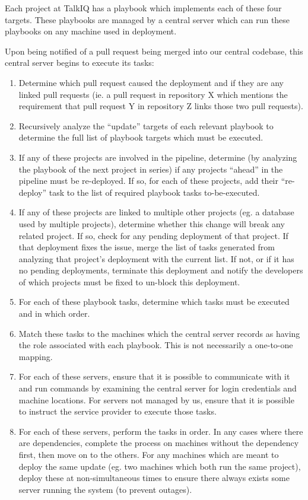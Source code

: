 \documentclass[12pt]{article}
\begin{document}
Each project at TalkIQ has a playbook which implements each of these four targets. These playbooks are managed by a central server which can run these playbooks on any machine used in deployment.

Upon being notified of a pull request being merged into our central codebase, this central server begins to execute its tasks:
\begin{enumerate}
\item Determine which pull request caused the deployment and if they are any linked pull requests (ie. a pull request in repository X which mentions the requirement that pull request Y in repository Z links those two pull requests).
\item Recursively analyze the ``update'' targets of each relevant playbook to determine the full list of playbook targets which must be executed.
\item If any of these projects are involved in the pipeline, determine (by analyzing the playbook of the next project in series) if any projects ``ahead'' in the pipeline must be re-deployed. If so, for each of these projects, add their ``re-deploy'' task to the list of required playbook tasks to-be-executed.
\item If any of these projects are linked to multiple other projects (eg. a database used by multiple projects), determine whether this change will break any related project. If so, check for any pending deployment of that project. If that deployment fixes the issue, merge the list of tasks generated from analyzing that project's deployment with the current list. If not, or if it has no pending deployments, terminate this deployment and notify the developers of which projects must be fixed to un-block this deployment.
\item For each of these playbook tasks, determine which tasks must be executed and in which order.
\item Match these tasks to the machines which the central server records as having the role associated with each playbook. This is not necessarily a one-to-one mapping.
\item For each of these servers, ensure that it is possible to communicate with it and run commands by examining the central server for login credentials and machine locations. For servers not managed by us, ensure that it is possible to instruct the service provider to execute those tasks.
\item For each of these servers, perform the tasks in order. In any cases where there are dependencies, complete the process on machines without the dependency first, then move on to the others. For any machines which are meant to deploy the same update (eg. two machines which both run the same project), deploy these at non-simultaneous times to ensure there always exists some server running the system (to prevent outages).

\end{enumerate}
\end{document}
